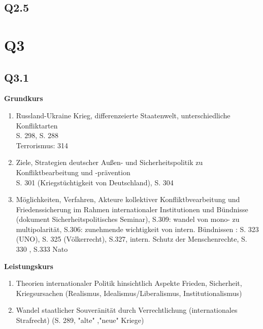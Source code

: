 \documentclass[12pt, letterpaper]{article}
\begin{document}
\subsection{Q2.5}
\label{sec:Q2.5}

\newpage
\section{Q3}
\label{sec:Q3}
\subsection{Q3.1}
\label{sec:Q3.1}
\textbf{Grundkurs} 
\begin{enumerate}
  \item Russland-Ukraine Krieg, differenzeierte Staatenwelt, unterschiedliche Konfliktarten \\
    S. 298, S. 288\\
    Terrorismus: 314


  \item Ziele, Strategien deutscher Außen- und Sicherheitspolitik zu Konfliktbearbeitung und -prävention\\
    S. 301 (Kriegstüchtigkeit von Deutschland), S. 304

  \item Möglichkeiten, Verfahren, Akteure kollektiver Konfliktbvearbeitung und Friedenssicherung im Rahmen internationaler Institutionen und Bündnisse\\
    (dokument Sicherheitspolitisches Seminar), S.309: wandel von mono- zu multipolarität, S.306: zunehmende wichtigkeit von intern. Bündnissen : S. 323 (UNO), S. 325 (Völkerrecht), S.327, intern. Schutz der Menschenrechte, S. 330 , S.333 Nato
\end{enumerate}
\textbf{Leistungskurs} 
\begin{enumerate}
  \item Theorien internationaler Politik hinsichtlich Aspekte Frieden, Sicherheit, Kriegsursachen (Realismus, Idealismus/Liberalismus, Institutionalismus)
  \item Wandel staatlicher Souveränität durch Verrechtlichung (internationales Strafrecht) (S. 289, "alte" ,"neue" Kriege)

\end{enumerate}
\end{document}
